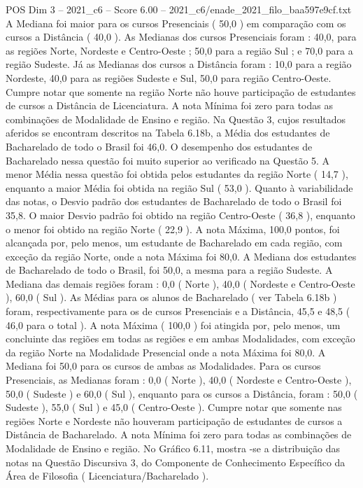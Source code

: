 \begin{textsample}{POS Dim 3 – 2021\_c6 – Score 6.00 – 2021\_c6/enade\_2021\_filo\_baa597e9cf.txt}
A Mediana foi maior para os cursos Presenciais ( 50,0 ) em comparação com os cursos a Distância ( 40,0 ).
As Medianas dos cursos Presenciais foram : 40,0, para as regiões Norte, Nordeste e Centro-Oeste ; 50,0 para a região Sul ; e 70,0 para a região Sudeste.
Já as Medianas dos cursos a Distância foram : 10,0 para a região Nordeste, 40,0 para as regiões Sudeste e Sul, 50,0 para região Centro-Oeste.
Cumpre notar que somente na região Norte não houve participação de estudantes de cursos a Distância de Licenciatura.
A nota Mínima foi zero para todas as combinações de Modalidade de Ensino e região.
Na Questão 3, cujos resultados aferidos se encontram descritos na Tabela 6.18b, a Média dos estudantes de Bacharelado de todo o Brasil foi 46,0.
O desempenho dos estudantes de Bacharelado nessa questão foi muito superior ao verificado na Questão 5.
A menor Média nessa questão foi obtida pelos estudantes da região Norte ( 14,7 ), enquanto a maior Média foi obtida na região Sul ( 53,0 ).
Quanto à variabilidade das notas, o Desvio padrão dos estudantes de Bacharelado de todo o Brasil foi 35,8.
O maior Desvio padrão foi obtido na região Centro-Oeste ( 36,8 ), enquanto o menor foi obtido na região Norte ( 22,9 ).
A nota Máxima, 100,0 pontos, foi alcançada por, pelo menos, um estudante de Bacharelado em cada região, com exceção da região Norte, onde a nota Máxima foi 80,0.
A Mediana dos estudantes de Bacharelado de todo o Brasil, foi 50,0, a mesma para a região Sudeste.
A Mediana das demais regiões foram : 0,0 ( Norte ), 40,0 ( Nordeste e Centro-Oeste ), 60,0 ( Sul ).
As Médias para os alunos de Bacharelado ( ver Tabela 6.18b ) foram, respectivamente para os de cursos Presenciais e a Distância, 45,5 e 48,5 ( 46,0 para o total ).
A nota Máxima ( 100,0 ) foi atingida por, pelo menos, um concluinte das regiões em todas as regiões e em ambas Modalidades, com exceção da região Norte na Modalidade Presencial onde a nota Máxima foi 80,0.
A Mediana foi 50,0 para os cursos de ambas as Modalidades.
Para os cursos Presenciais, as Medianas foram : 0,0 ( Norte ), 40,0 ( Nordeste e Centro-Oeste ), 50,0 ( Sudeste ) e 60,0 ( Sul ), enquanto para os cursos a Distância, foram : 50,0 ( Sudeste ), 55,0 ( Sul ) e 45,0 ( Centro-Oeste ).
Cumpre notar que somente nas regiões Norte e Nordeste não houveram participação de estudantes de cursos a Distância de Bacharelado.
A nota Mínima foi zero para todas as combinações de Modalidade de Ensino e região.
No Gráfico 6.11, mostra -se a distribuição das notas na Questão Discursiva 3, do Componente de Conhecimento Específico da Área de Filosofia ( Licenciatura/Bacharelado ).

\end{textsample}
